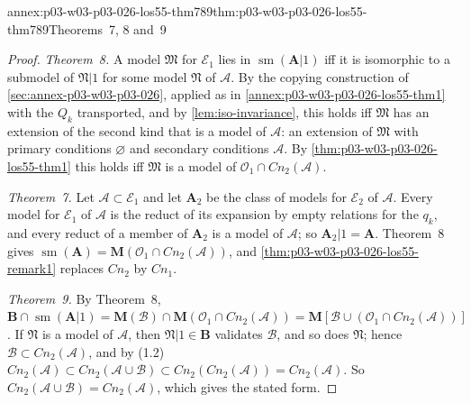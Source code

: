 \begin{annexitem}{annex:p03-w03-p03-026-los55-thm789}{thm:p03-w03-p03-026-los55-thm789}{Theorems~7, 8 and~9}
\begin{proof}
\emph{Theorem~8.}  A model \(\mathfrak M\) for \(\mathcal E_1\) lies in
\(\operatorname{sm}(\mathbf A|1)\) iff it is isomorphic to a submodel of
\(\mathfrak N|1\) for some model \(\mathfrak N\) of \(\mathcal A\).  By the
copying construction of \cref{sec:annex-p03-w03-p03-026}, applied as in
\cref{annex:p03-w03-p03-026-los55-thm1} with the \(Q_k\) transported, and by
\cref{lem:iso-invariance}, this holds iff \(\mathfrak M\) has an extension of
the second kind that is a model of \(\mathcal A\): an extension of
\(\mathfrak M\) with primary conditions \(\varnothing\) and secondary
conditions \(\mathcal A\).  By \cref{thm:p03-w03-p03-026-los55-thm1} this holds
iff \(\mathfrak M\) is a model of
\(\mathcal O_1\cap\mathit{Cn}_2(\mathcal A)\).

\emph{Theorem~7.}  Let \(\mathcal A\subset\mathcal E_1\) and let
\(\mathbf A_2\) be the class of models for \(\mathcal E_2\) of \(\mathcal A\).
Every model for \(\mathcal E_1\) of \(\mathcal A\) is the reduct of its
expansion by empty relations for the \(q_k\), and every reduct of a member of
\(\mathbf A_2\) is a model of \(\mathcal A\); so \(\mathbf A_2|1=\mathbf A\).
Theorem~8 gives
\(\operatorname{sm}(\mathbf A)=\mathbf M(\mathcal O_1\cap\mathit{Cn}_2(\mathcal A))\),
and \cref{thm:p03-w03-p03-026-los55-remark1} replaces \(\mathit{Cn}_2\) by
\(\mathit{Cn}_1\).

\emph{Theorem~9.}  By Theorem~8,
\(\mathbf B\cap\operatorname{sm}(\mathbf A|1)=\mathbf M(\mathcal B)\cap\mathbf M(\mathcal O_1\cap\mathit{Cn}_2(\mathcal A))
=\mathbf M[\mathcal B\cup(\mathcal O_1\cap\mathit{Cn}_2(\mathcal A))]\).  If
\(\mathfrak N\) is a model of \(\mathcal A\), then \(\mathfrak N|1\in\mathbf B\)
validates \(\mathcal B\), and so does \(\mathfrak N\); hence
\(\mathcal B\subset\mathit{Cn}_2(\mathcal A)\), and by (1.2)
\(\mathit{Cn}_2(\mathcal A)\subset\mathit{Cn}_2(\mathcal A\cup\mathcal B)\subset\mathit{Cn}_2(\mathit{Cn}_2(\mathcal A))=\mathit{Cn}_2(\mathcal A)\).
So \(\mathit{Cn}_2(\mathcal A\cup\mathcal B)=\mathit{Cn}_2(\mathcal A)\), which
gives the stated form.
\end{proof}
\end{annexitem}


